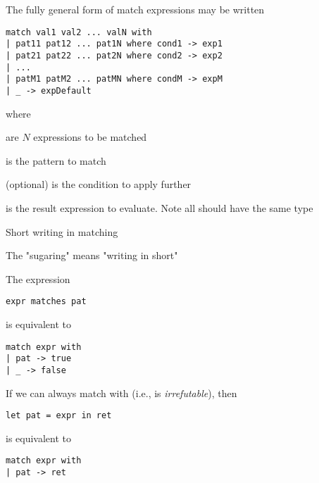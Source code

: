 \documentclass[svgnames,fleqn]{beamer}
\begin{document}
\begin{frame}[fragile]
The fully general form of match expressions may be written
\begin{lstlisting}
match val1 val2 ... valN with
| pat11 pat12 ... pat1N where cond1 -> exp1
| pat21 pat22 ... pat2N where cond2 -> exp2
| ...
| patM1 patM2 ... patMN where condM -> expM
| _ -> expDefault
\end{lstlisting}

where

\bi
\item {} are $N$ expressions to be matched
\item {} is the pattern to match 
\item {} (optional) is the condition to apply further
\item {} is the result expression to evaluate. Note all  should have the same type
\ei

\end{frame}

\begin{frame}[fragile]{Short writing in matching}

\bi
\item The "sugaring" means "writing in short"
\item The expression
\begin{lstlisting}
expr matches pat
\end{lstlisting}
is equivalent to
\begin{lstlisting}
match expr with
| pat -> true
| _ -> false
\end{lstlisting}

\item If we can always match  with  (i.e.,  is {\em irrefutable}), then
\begin{lstlisting}
let pat = expr in ret
\end{lstlisting}
is equivalent to
\begin{lstlisting}
match expr with
| pat -> ret
\end{lstlisting}
\ei
\end{frame}
\end{document}
